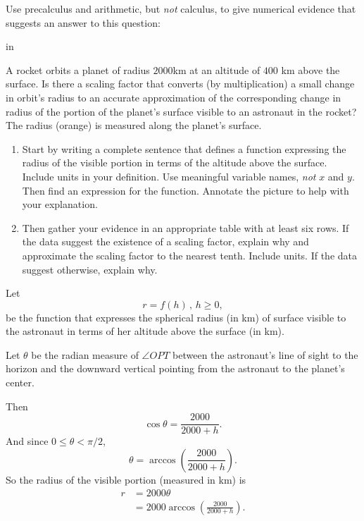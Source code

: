 \documentclass{ximera}
\newcommand{\pskip}{\vskip 0.1 in}
\begin{document}
\begin{question} \label{Qpfer093}

Use precalculus and arithmetic, but \emph{not} calculus, to give numerical evidence that suggests an answer to this question:

\pskip

A rocket orbits a planet of radius $2000$km at an altitude of $400$ km above the surface. Is there a scaling factor that converts (by multiplication) a small change in orbit's radius to an accurate approximation of the corresponding change in radius of the portion of the planet's surface visible to an astronaut in the rocket? The radius (orange) is measured along the planet's surface.


\begin{enumerate}

\item Start by writing a complete sentence that defines a function expressing the radius of the visible portion in terms of the altitude above the surface. Include units in your definition. Use meaningful variable names, \emph{not} $x$ and $y$. Then find an expression for the function. Annotate the picture to help with your explanation.

\item Then gather your evidence in an appropriate table with at least six rows. If the data suggest the existence of a scaling factor, explain why and approximate the scaling factor to the nearest tenth. Include units. If the data suggest otherwise, explain why.

\end{enumerate}

\begin{explanation}
Let 
\[
  r = f(h) \, , \, h\geq 0,
\]
be the function that expresses the spherical radius (in km) of surface visible to the astronaut in terms of her altitude above the surface (in km).

Let $\theta$ be the radian measure of $\angle OPT$ between the astronaut's line of sight to the horizon and the downward vertical pointing from the astronaut to the planet's center. 

Then  
\[
  \cos\theta = \frac{2000}{2000+h}.
\]
And since $0 \leq \theta  < \pi/2$,
\[
     \theta = \arccos\left( \frac{2000}{2000+h}  \right) .
\]
So the radius of the visible portion (measured in km) is
\begin{align*}
    r  &= 2000 \theta \\
       &= 2000 \arccos\left( \frac{2000}{2000+h}  \right) .
\end{align*}


\end{explanation}
\end{question}
\end{document}
